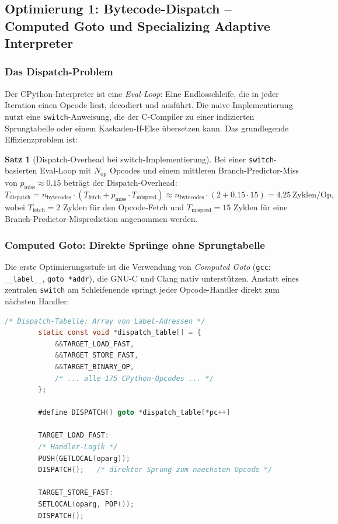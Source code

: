 ﻿\documentclass[a4paper,12pt]{scrreprt}
\theoremstyle{definition}
\newtheorem{satz}{Satz}[section]
\begin{document}
	\subsection{Optimierung 1: Bytecode-Dispatch -- Computed Goto und Specializing Adaptive Interpreter}
	
	\subsubsection{Das Dispatch-Problem}
	
	Der CPython-Interpreter ist eine \emph{Eval-Loop}: Eine Endlosschleife,
	die in jeder Iteration einen Opcode liest, decodiert und ausführt.
	Die naive Implementierung nutzt eine \texttt{switch}-Anweisung, die der
	C-Compiler zu einer indizierten Sprungtabelle oder einem Kaskaden-If-Else
	übersetzen kann. Das grundlegende Effizienzproblem ist:
	
	\begin{satz}[Dispatch-Overhead bei switch-Implementierung]
		\label{satz:switch_overhead}
		Bei einer \texttt{switch}-basierten Eval-Loop mit $N_{\mathrm{op}}$
		Opcodes und einem mittleren Branch-Predictor-Miss von
		$p_{\mathrm{miss}} \approx 0.15$ beträgt der Dispatch-Overhead:
		\[
		T_{\mathrm{dispatch}} = n_{\mathrm{bytecodes}} \cdot
		\left(T_{\mathrm{fetch}} + p_{\mathrm{miss}} \cdot T_{\mathrm{mispred}}\right)
		\approx n_{\mathrm{bytecodes}} \cdot (2 + 0.15 \cdot 15) = 4.25\,\mathrm{Zyklen/Op},
		\]
		wobei $T_{\mathrm{fetch}} = 2$ Zyklen für den Opcode-Fetch und
		$T_{\mathrm{mispred}} = 15$ Zyklen für eine Branch-Predictor-Misprediction
		angenommen werden.
	\end{satz}
	
	\subsubsection{Computed Goto: Direkte Sprünge ohne Sprungtabelle}
	
	Die erste Optimierungsstufe ist die Verwendung von \emph{Computed Goto}
	(\texttt{gcc}: \texttt{\_\_label\_\_}, \texttt{goto *addr}), die
	GNU-C und Clang nativ unterstützen. Anstatt eines zentralen
	\texttt{switch} am Schleifenende springt jeder Opcode-Handler direkt
	zum nächsten Handler:
	
	\begin{lstlisting}[language=C, caption={Computed-Goto Dispatch in CPython (vereinfacht)},
		label=lst:computed_goto]
		/* Dispatch-Tabelle: Array von Label-Adressen */
		static const void *dispatch_table[] = {
			&&TARGET_LOAD_FAST,
			&&TARGET_STORE_FAST,
			&&TARGET_BINARY_OP,
			/* ... alle 175 CPython-Opcodes ... */
		};
		
		#define DISPATCH() goto *dispatch_table[*pc++]
		
		TARGET_LOAD_FAST:
		/* Handler-Logik */
		PUSH(GETLOCAL(oparg));
		DISPATCH();   /* direkter Sprung zum naechsten Opcode */
		
		TARGET_STORE_FAST:
		SETLOCAL(oparg, POP());
		DISPATCH();
	\end{lstlisting}
	
\end{document}
